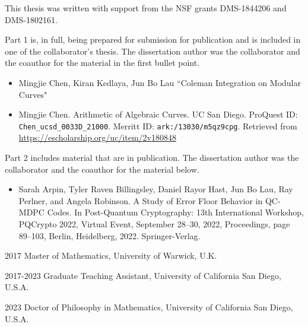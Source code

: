 \begin{frontmatter}
\begin{acknowledgements}
This thesis was written with support from the NSF grants DMS-1844206 and DMS-1802161.

Part 1 is, in full, being prepared for submission for publication and is included in one of the collaborator's thesis. The dissertation author was the collaborator and the coauthor for the material in the first bullet point.

\begin{itemize}
\item Mingjie Chen, Kiran Kedlaya, Jun Bo Lau ``Coleman Integration on Modular Curves"
\item Mingjie Chen. Arithmetic of Algebraic Curves. UC San Diego. ProQuest ID: \texttt{Chen\_ucsd\_0033D\_21000}. Merritt ID: \texttt{ark:/13030/m5qz9cpg}. Retrieved from \href{https://escholarship.org/uc/item/2v180848}{https://escholarship.org/uc/item/2v180848}
\end{itemize}

Part 2 includes material that are in publication. The dissertation author was the collaborator and the coauthor for the material below.

\begin{itemize}
\item Sarah Arpin, Tyler Raven Billingsley, Daniel Rayor Hast, Jun Bo Lau, Ray Perlner, and
 Angela Robinson. A Study of Error Floor Behavior in QC-MDPC Codes. In Post-Quantum
 Cryptography: 13th International Workshop, PQCrypto 2022, Virtual Event, September
 28–30, 2022, Proceedings, page 89–103, Berlin, Heidelberg, 2022.
 Springer-Verlag.
\end{itemize}

\end{acknowledgements}


%
%
\begin{vitapage}
\begin{vita}
  \item[2017] Master of Mathematics, University of Warwick, U.K.
  \item[2017-2023] Graduate Teaching Assistant, University of California San Diego, U.S.A.
  \item[2023] Doctor of Philosophy in Mathematics, University of California San Diego, U.S.A.
\end{vita}
\end{vitapage}


%
%
\begin{abstract}


\end{abstract}
\end{frontmatter}
